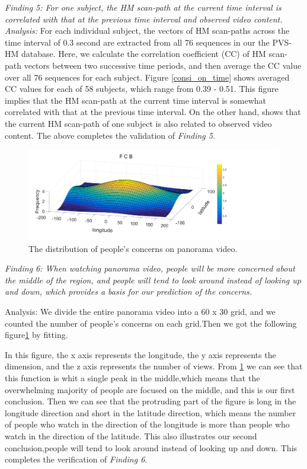 \documentclass[10pt,journal,compsoc]{IEEEtran}
\begin{document}
\emph{Finding 5: For one subject, the HM scan-path at the current time interval is correlated with that at the previous time interval and observed video content. }
\\ \textit{Analysis:} For each individual subject, the vectors of HM scan-paths across the time interval of 0.3 second are extracted from all 76 sequences in our the PVS-HM database. Here, we calculate the correlation coefficient (CC) of HM scan-path vectors between two successive time periods, and then average the CC value over all 76 sequences for each subject. Figure \ref{consi_on_time} shows averaged CC values for each of 58 subjects, which range from 0.39 - 0.51. This figure implies that the HM scan-path at the current time interval is somewhat correlated with that at the previous time interval. On the other hand, \cite{hu2017deep} shows that the current HM scan-path of one subject is also related to observed video content. The above completes the validation of \textit{Finding 5}.

\begin{figure}
	\begin{center}
		\centerline{\includegraphics[width=2\columnwidth]{figures/database/huoshantu}}%
		\caption{\footnotesize{The distribution of people's concerns on panorama video. }}
		\label{huoshantu}
	\end{center}
\end{figure}

{\color{red}
\emph{Finding 6: When watching panorama video, people will be more concerned about the middle of the region, and people will tend to look around instead of looking up and down, which provides a basis for our prediction of the concerns. }

Analysis: We divide the entire panorama video into a $60$ x $30$ grid, and we counted the number of people's concerns on each grid.Then we got the following figure\ref{huoshantu} by fitting.

In this figure, the x axis represents the longitude, the y axis represents the dimension, and the z axis represents the number of views.
From \ref{huoshantu} we can see that this function is whit a single peak in the middle,which means that the overwhelming majority of people are focused on the middle, and this is our first conclusion. Then we can see that the protruding part of the figure is long in the longitude direction and short in the latitude direction, which means the number of people who watch in the direction of the longitude is more than people who watch in the direction of the latitude. This also illustrates our second conclusion,people will tend to look around instead of looking up and down.
This completes the verification of \textit{Finding 6}.
}
\end{document}
